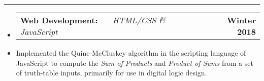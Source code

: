 \documentclass[10pt,letterpaper]{article}
\makeatletter
\newcommand{\header}[2]
{
	\begin{tabular*}{\linewidth}{l @{\extracolsep{\fill}} r}
		\hspace{-27pt} #1 & #2 \\
	\end{tabular*}
}
\makeatother
\begin{document}
\hrule

\begin{itemize}
	\item[]
		\header
			{	
				\textbf{Web Development: }
				\href{https://aashpointo.github.io/KmapWebsite/}{\emph{\underline{\smash{aashpointo.github.io/KmapWebsite}}}} \ \ \ \footnotesize \emph{HTML/CSS \& JavaScript}
				}
				{\textbf{Winter 2018}}
		\item
			Implemented the Quine-McCluskey algorithm in the scripting language of JavaScript to compute the \emph{Sum of Products} and \emph{Product of Sums} from a set of truth-table inputs, primarily for use in digital logic design.

\end{itemize}
\end{document}
